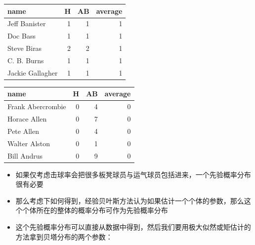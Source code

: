 \documentclass[]{book}
\newenvironment{Shaded}{\begin{snugshade}}{\end{snugshade}}
\newcommand{\CommentTok}[1]{\textcolor[rgb]{0.56,0.35,0.01}{\textit{#1}}}
\newcommand{\DecValTok}[1]{\textcolor[rgb]{0.00,0.00,0.81}{#1}}
\newcommand{\KeywordTok}[1]{\textcolor[rgb]{0.13,0.29,0.53}{\textbf{#1}}}
\newcommand{\NormalTok}[1]{#1}
\newcommand{\OperatorTok}[1]{\textcolor[rgb]{0.81,0.36,0.00}{\textbf{#1}}}
\newcommand{\StringTok}[1]{\textcolor[rgb]{0.31,0.60,0.02}{#1}}
\begin{document}
\begin{Shaded}
\end{Shaded}

\begin{tabular}{l|r|r|r}
\hline
name & H & AB & average\\
\hline
Jeff Banister & 1 & 1 & 1\\
\hline
Doc Bass & 1 & 1 & 1\\
\hline
Steve Biras & 2 & 2 & 1\\
\hline
C. B. Burns & 1 & 1 & 1\\
\hline
Jackie Gallagher & 1 & 1 & 1\\
\hline
\end{tabular}

\begin{Shaded}
\end{Shaded}

\begin{tabular}{l|r|r|r}
\hline
name & H & AB & average\\
\hline
Frank Abercrombie & 0 & 4 & 0\\
\hline
Horace Allen & 0 & 7 & 0\\
\hline
Pete Allen & 0 & 4 & 0\\
\hline
Walter Alston & 0 & 1 & 0\\
\hline
Bill Andrus & 0 & 9 & 0\\
\hline
\end{tabular}

\begin{itemize}
\item
  如果仅考虑击球率会把很多板凳球员与运气球员包括进来，一个先验概率分布很有必要
\item
  那么考虑下如何得到，经验贝叶斯方法认为如果估计一个个体的参数，那么这个个体所在的整体的概率分布可作为先验概率分布
\item
  这个先验概率分布可以直接从数据中得到，然后我们要用极大似然或矩估计的方法拿到贝塔分布的两个参数：
\end{itemize}
\end{document}
